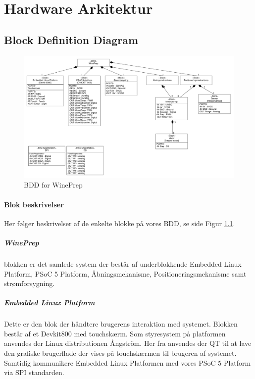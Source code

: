 \chapter{Hardware Arkitektur}

\section{Block Definition Diagram}

\begin{figure}[H]
	\centering
	\includegraphics[scale=0.3]{blockdefinitiondiagram}
	\caption{BDD for WinePrep}
	\label{BDD}
\end{figure}

\subsubsection{Blok beskrivelser}
Her følger beskrivelser af de enkelte blokke på vores BDD, se side \pageref{BDD} Figur \ref{BDD}.

\paragraph{WinePrep} blokken er det samlede system der består af underblokkende Embedded Linux Platform, PSoC 5 Platform, Åbningsmekanisme, Positioneringsmekanisme samt strømforsygning.

\paragraph{Embedded Linux Platform} Dette er den blok der håndtere brugerens interaktion med systemet. Blokken består af et Devkit800 med touchskærm. Som styresystem på platformen anvendes der Linux distributionen Ångström. Her fra anvendes der QT til at lave den grafiske brugerflade der vises på touchskærmen til brugeren af systemet. Samtidig kommunikere Embedded Linux Platformen med vores PSoC 5 Platform via SPI standarden.

